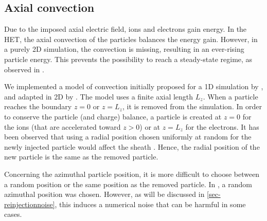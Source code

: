 \subsection{Axial convection}

Due to the imposed axial electric field, ions and electrons gain energy.
In the \ac{HET}, the axial convection of the particles balances the energy gain.
However, in a purely \ac{2D} simulation, the convection is missing, resulting in an ever-rising particle energy.
This prevents the possibility to reach a steady-state regime, as observed in \citet{heron2013,janhunen2018}.

We implemented a model of convection initially proposed for a \ac{1D} simulation by \citet{lafleur2016a}, and adapted in \ac{2D} by \citet{croes2017a}.
The model uses a finite axial length $L_z$.
When a particle reaches the boundary $z=0$ or $z=L_z$, it is removed from the simulation.
In order to conserve the particle (and charge) balance, a particle is created at $z=0$ for the ions (that are accelerated toward $z>0$) or at $z=L_z$ for the electrons.
It has been observed that using a radial position chosen uniformly at random for the newly injected particle would affect the sheath \citep{croes2017a}.
Hence, the radial position of the new particle is the same as the removed particle.

Concerning the azimuthal particle position, it is more difficult to choose between a random position or the same position as the removed particle.
In \citet{lafleur2016a,croes2017a}, a random azimuthal position was chosen.
However, as will be discussed in \cref{sec-reinjectionnoise}, this induces a numerical noise that can be harmful in some cases.
